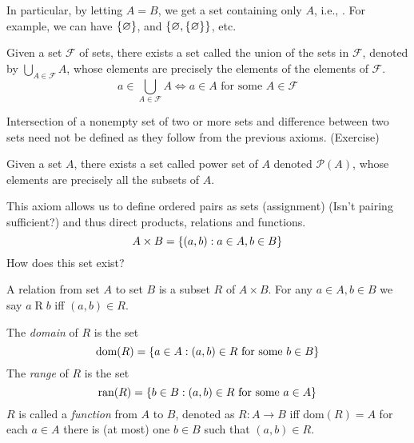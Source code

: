 \documentclass[12pt]{article}
\begin{document}
\begin{rem}
    In particular, by letting $A = B$, we get a set containing only $A$, i.e., . For example, we can have $\set{\varnothing}$, and $\set{\varnothing, \{\varnothing}\}$, etc.
\end{rem}

\begin{axiom} \label{zfc:unions}
    Given a set $\mathscr{F}$ of sets, there exists a set called the union of the sets in $\mathscr{F}$, denoted by $\bigcup_{A \in \mathscr{F}} A$, whose elements are precisely the elements of the elements of $\mathscr{F}$.
    \[
        a \in \bigcup_{A \in \mathscr{F}} A \iff a \in A \text{ for some } A \in \mathscr{F}
    \]
\end{axiom}

\begin{rem}
    Intersection of a nonempty set of two or more sets and difference between two sets need not be defined as they follow from the previous axioms. (Exercise)
\end{rem}

\begin{axiom} \label{zfc:powers}
    Given a set $A$, there exists a set called power set of $A$ denoted $\mathscr{P}(A)$, whose elements are precisely all the subsets of $A$.   
\end{axiom}

\begin{rem}
    This axiom allows us to define ordered pairs as sets (assignment) (\textcolor{red!85!black}{Isn't pairing sufficient?}) and thus direct products, relations and functions. \[
        A \times B = \set{(a, b) : a \in A, b \in B}
    \] \textcolor{red!85!black}{How does this set exist?}
\end{rem}

\begin{defn} \label{defn:relation}
    A relation from set $A$ to set $B$ is a subset $R$ of $A \times B$. For any $a \in A, b \in B$ we say $a\mathrel{R}b$ iff $(a, b) \in R$.
    \begin{outline}
        \1 The \emph{domain} of $R$ is the set
        \[
            \text{dom}(R) = \set{ a \in A : (a, b) \in R \text{ for some } b \in B}
        \]
        \1 The \emph{range} of $R$ is the set
        \[
            \text{ran}(R) = \set{ b \in B : (a, b) \in R \text{ for some } a \in A}
        \]
        \1 $R$ is called a \emph{function} from $A$ to $B$, denoted as $R: A \to B$ iff
            \2 dom$(R) = A$
            \2 for each $a \in A$ there is (at most) one $b \in B$ such that $(a, b) \in R$.
    \end{outline}
\end{defn}
\end{document}
